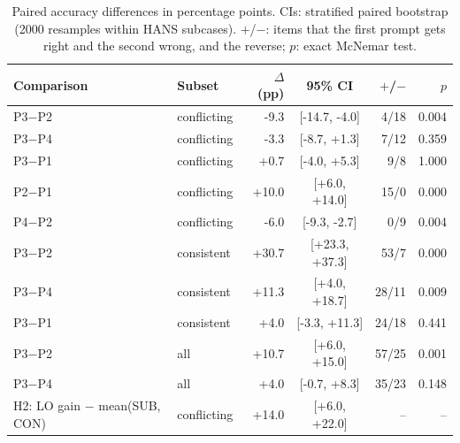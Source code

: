\begin{table}[t]
\centering
\small
\begin{tabular}{llrcrr}
\toprule
Comparison & Subset & $\Delta$ (pp) & 95\% CI & $+$/$-$ & $p$ \\
\midrule
P3$-$P2 & conflicting & -9.3 & [-14.7, -4.0] & 4/18 & 0.004 \\
P3$-$P4 & conflicting & -3.3 & [-8.7, +1.3] & 7/12 & 0.359 \\
P3$-$P1 & conflicting & +0.7 & [-4.0, +5.3] & 9/8 & 1.000 \\
P2$-$P1 & conflicting & +10.0 & [+6.0, +14.0] & 15/0 & 0.000 \\
P4$-$P2 & conflicting & -6.0 & [-9.3, -2.7] & 0/9 & 0.004 \\
P3$-$P2 & consistent & +30.7 & [+23.3, +37.3] & 53/7 & 0.000 \\
P3$-$P4 & consistent & +11.3 & [+4.0, +18.7] & 28/11 & 0.009 \\
P3$-$P1 & consistent & +4.0 & [-3.3, +11.3] & 24/18 & 0.441 \\
P3$-$P2 & all & +10.7 & [+6.0, +15.0] & 57/25 & 0.001 \\
P3$-$P4 & all & +4.0 & [-0.7, +8.3] & 35/23 & 0.148 \\
\midrule
H2: LO gain $-$ mean(SUB, CON) & conflicting & +14.0 & [+6.0, +22.0] & -- & -- \\
\bottomrule
\end{tabular}
\caption{Paired accuracy differences in percentage points. CIs: stratified paired bootstrap (2000 resamples within HANS subcases). $+$/$-$: items that the first prompt gets right and the second wrong, and the reverse; $p$: exact McNemar test.}
\label{tab:tests}
\end{table}
